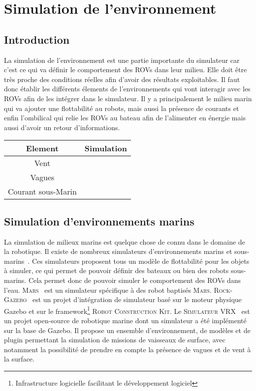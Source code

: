 \chapter{Simulation de l'environnement}
	
	\section{Introduction}

		La simulation de l'environnement est une partie importante du simulateur car c'est ce qui va définir le comportement des \gls{ROV}s dans leur milieu. Elle doit être très proche des conditions réelles afin d'avoir des résultats exploitables. Il faut donc établir les différents élements de l'environnements qui vont interagir avec les \gls{ROV}s afin de les intégrer dans le simulateur. Il y a principalement le milieu marin qui va ajouter une flottabilité au robots, mais aussi la présence de courants et enfin l'ombilical qui relie les \gls{ROV}s au bateau afin de l'alimenter en énergie mais aussi d'avoir un retour d'informations.

		\begin{table}[ht]
			\centering
			\begin{tabular}{|c|c|}
				\hline
				Element & Simulation \\
				\hline
				Vent & \xmark\\
				\hline
				Vagues & \xmark\\
				\hline
				Courant sous-Marin & \cmark \\
				\hline
			\end{tabular}
		\end{table}

	\section{Simulation d'environnements marins}

		La simulation de milieux marins est quelque chose de connu dans le domaine de la robotique. Il existe de nombreux simulateurs d'environnements marins et sous-marins~\cite{Manhaes_2016, bingham19toward, MARS, Rock}. Ces simulateurs proposent tous un modèle de flottabilité pour les objets à simuler, ce qui permet de pouvoir définir des bateaux ou bien des robots sous-marins. Cela permet donc de pouvoir simuler le comportement des \gls{ROV}s dans l'eau. \textsc{Mars}~\cite{MARS} est un simulateur spécifique à des robot baptisés \textsc{Mars}. \textsc{Rock-Gazebo}~\cite{Rock} est un projet d'intégration de simulateur basé sur le moteur physique \gls{Gazebo} et sur le framework\footnote{Infrastructure logicielle facilitant le développement logiciel} \textsc{Robot Construction Kit}. Le \textsc{Simulateur VRX}~\cite{bingham19toward} est un projet open-source de robotique marine dont un simulateur a été implémenté sur la base de \gls{Gazebo}. Il propose un ensemble d'environnement, de modèles et de plugin permettant la simulation de missions de vaisseaux de surface, avec notamment la possibilité de prendre en compte la présence de vagues et de vent à la surface.

